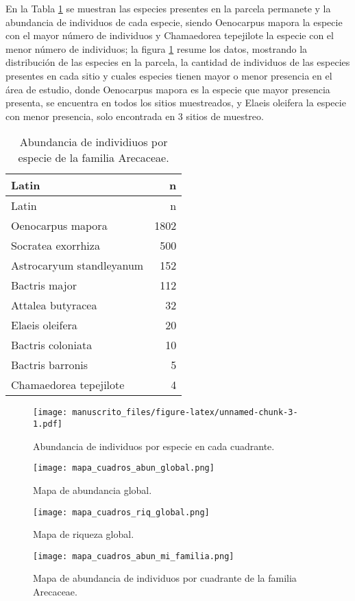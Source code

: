 \documentclass[11pt,]{article}
\begin{document}
En la Tabla \ref{tab:abun_sp} se muestran las especies presentes en la
parcela permanete y la abundancia de individuos de cada especie, siendo
Oenocarpus mapora la especie con el mayor número de individuos y
Chamaedorea tepejilote la especie con el menor número de individuos; la
figura \ref{fig:abun_sp_q} resume los datos, mostrando la distribución
de las especies en la parcela, la cantidad de individuos de las especies
presentes en cada sitio y cuales especies tienen mayor o menor presencia
en el área de estudio, donde Oenocarpus mapora es la especie que mayor
presencia presenta, se encuentra en todos los sitios muestreados, y
Elaeis oleifera la especie con menor presencia, solo encontrada en 3
sitios de muestreo.

\begin{longtable}[]{@{}lr@{}}
\caption{\label{tab:abun_sp}Abundancia de individiuos por especie de la
familia Arecaceae.}\tabularnewline
\toprule
Latin & n\tabularnewline
\midrule
\endfirsthead
\toprule
Latin & n\tabularnewline
\midrule
\endhead
Oenocarpus mapora & 1802\tabularnewline
Socratea exorrhiza & 500\tabularnewline
Astrocaryum standleyanum & 152\tabularnewline
Bactris major & 112\tabularnewline
Attalea butyracea & 32\tabularnewline
Elaeis oleifera & 20\tabularnewline
Bactris coloniata & 10\tabularnewline
Bactris barronis & 5\tabularnewline
Chamaedorea tepejilote & 4\tabularnewline
\bottomrule
\end{longtable}

\begin{figure}
\centering
\texttt{[image: manuscrito\_files/figure-latex/unnamed-chunk-3-1.pdf]}
\caption{\label{fig:abun_sp_q}Abundancia de individuos por especie en
cada cuadrante.}
\end{figure}

\begin{figure}
\centering
\texttt{[image: mapa\_cuadros\_abun\_global.png]}
\caption{Mapa de abundancia global.
\label{fig:mapa_cuadros_abun_global}}
\end{figure}

\begin{figure}
\centering
\texttt{[image: mapa\_cuadros\_riq\_global.png]}
\caption{Mapa de riqueza global. \label{fig:mapa_cuadros_riq_global}}
\end{figure}

\begin{figure}
\centering
\texttt{[image: mapa\_cuadros\_abun\_mi\_familia.png]}
\caption{Mapa de abundancia de individuos por cuadrante de la familia
Arecaceae. \label{fig:mapa_cuadros_abun_mi_familia}}
\end{figure}
\end{document}
